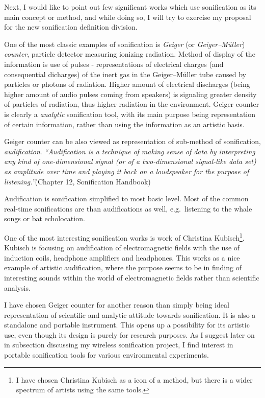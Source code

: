 \documentclass[11pt,a4paper,oneside]{report}
\begin{document}


Next, I would like to point out few significant works which use sonification as its main concept or method, and while doing so, I will try to exercise my proposal for the new sonification definition division.

One of the most classic examples of sonification is \emph{Geiger} (or \emph{Geiger–Müller}) \emph{counter}, particle detector measuring ionizing radiation. Method of display of the information is use of pulses - representations of electrical charges (and consequential dicharges) of the inert gas in the Geiger–Müller tube caused by particles or photons of radiation. Higher amount of electrical discharges (being higher amount of audio pulses coming from speakers) is signaling greater density of particles of radiation, thus higher radiation in the environment. \cite{Knoll2000} Geiger counter is clearly a \emph{analytic} sonification tool, with its main purpose being representation of certain information, rather than using the information as an artistic basis.

Geiger counter can be also viewed as representation of sub-method of sonification, \emph{audification}. \emph{``Audification is a technique of making sense of data by interpreting any kind of one-dimensional signal (or of a two-dimensional signal-like data set) as amplitude over time and playing it back on a loudspeaker for the purpose of listening.''}(Chapter 12, Sonification Handbook) 

Audification is sonification simplified to most basic level. Most of the common real-time sonifications are than audifications as well, e.g.\ listening to the whale songs or bat echolocation.

One of the most interesting sonification works is work of Christina Kubisch\footnote{I have chosen Christina Kubisch as a icon of a method, but there is a wider spectrum of artists using the same tools.}. Kubisch is focusing on audification of electromagnetic fields with the use of induction coils, headphone amplifiers and headphones. This works as a nice example of artistic audification, where the purpose seems to be in finding of interesting sounds within the world of electromagnetic fields rather than scientific analysis.

I have chosen Geiger counter for another reason than simply being ideal representation of scientific and analytic attitude towards sonification. It is also a standalone and portable instrument. This opens up a possibility for its artistic use, even though its design is purely for research purposes. As I suggest later on in subsection discussing my wireless sonification project, I find interest in portable sonification tools for various environmental experiments.
\end{document}

